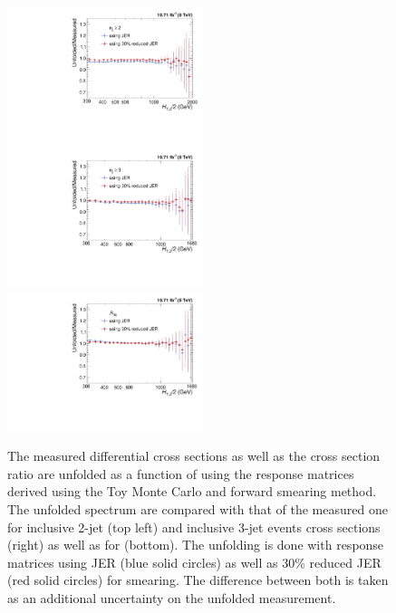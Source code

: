 \begin{figure}[!h]
 \begin{center}
 \hspace*{-3mm}\includegraphics[width=0.51\textwidth]{Plots_HT_2_150/Ratio_Unfolding_data_NLO_2.pdf}%
 ~~\includegraphics[width=0.51\textwidth]{Plots_HT_2_150/Ratio_Unfolding_data_NLO_3.pdf}\\
 \includegraphics[width=0.51\textwidth]{Plots_HT_2_150/Ratio_Unfolding_data_NLO_ratio32.pdf}
 \caption{The measured differential cross sections as well as the cross section ratio \ratio are unfolded as a function of \httwo using the response matrices derived using the Toy Monte Carlo and forward smearing method. The unfolded spectrum are compared with that of the measured one for inclusive 2-jet (top left) and inclusive 3-jet events cross sections (right) as well as for \ratio (bottom). The unfolding is done with response matrices using JER (blue solid circles) as well as 30\% reduced JER (red solid circles) for smearing. The difference between both is taken as an additional uncertainty on the unfolded measurement.}
 \label{fig:unfolded_data}
 \end{center}
\end{figure}


